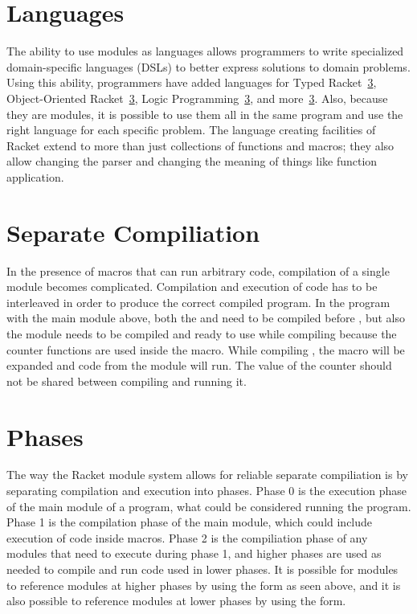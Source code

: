 \section{Languages}
The ability to use modules as languages allows programmers to write specialized domain-specific languages (DSLs) to better express solutions to domain problems. 
Using this ability, programmers have added languages for Typed Racket~\ref{}, Object-Oriented Racket~\ref{}, Logic Programming~\ref{}, and more~\ref{}.
Also, because they are modules, it is possible to use them all in the same program and use the right language for each specific problem.
The language creating facilities of Racket extend to more than just collections of functions and macros; they also allow changing the parser and changing the meaning of things like function application. 

\section{Separate Compiliation}
In the presence of macros that can run arbitrary code, compilation of a single module becomes complicated. 
Compilation and execution of code has to be interleaved in order to produce the correct compiled program.
In the program with the main module  above, both the  and  need to be compiled before , but also the  module needs to be compiled and ready to use while compiling  because the counter functions are used inside the  macro.
While compiling , the  macro will be expanded and code from the  module will run.
The value of the counter should not be shared between compiling  and running it.

\section{Phases}
The way the Racket module system allows for reliable separate compiliation is by separating compilation and execution into phases.
Phase 0 is the execution phase of the main module of a program, what could be considered running the program.
Phase 1 is the compilation phase of the main module, which could include execution of code inside macros. 
Phase 2 is the compiliation phase of any modules that need to execute during phase 1, and higher phases are used as needed to compile and run code used in lower phases.
It is possible for modules to reference modules at higher phases by using the  form as seen above, and it is also possible to reference modules at lower phases by using the  form.

